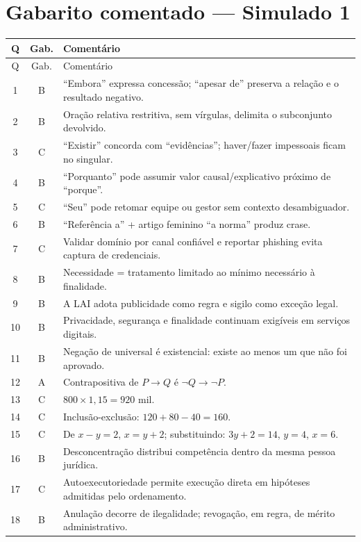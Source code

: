 \section{Gabarito comentado — Simulado 1}

\begin{longtable}{c c p{10.8cm}}
\toprule
Q & Gab. & Comentário \\
\midrule
\endfirsthead
\toprule Q & Gab. & Comentário \\
\midrule
\endhead
1 & B & ``Embora'' expressa concessão; ``apesar de'' preserva a relação e o resultado negativo. \\
2 & B & Oração relativa restritiva, sem vírgulas, delimita o subconjunto devolvido. \\
3 & C & ``Existir'' concorda com ``evidências''; haver/fazer impessoais ficam no singular. \\
4 & B & ``Porquanto'' pode assumir valor causal/explicativo próximo de ``porque''. \\
5 & C & ``Seu'' pode retomar equipe ou gestor sem contexto desambiguador. \\
6 & B & ``Referência a'' + artigo feminino ``a norma'' produz crase. \\
7 & C & Validar domínio por canal confiável e reportar phishing evita captura de credenciais. \\
8 & B & Necessidade = tratamento limitado ao mínimo necessário à finalidade. \\
9 & B & A LAI adota publicidade como regra e sigilo como exceção legal. \\
10 & B & Privacidade, segurança e finalidade continuam exigíveis em serviços digitais. \\
11 & B & Negação de universal é existencial: existe ao menos um que não foi aprovado. \\
12 & A & Contrapositiva de $P\rightarrow Q$ é $\neg Q\rightarrow\neg P$. \\
13 & C & $800\times1{,}15=920$ mil. \\
14 & C & Inclusão-exclusão: $120+80-40=160$. \\
15 & C & De $x-y=2$, $x=y+2$; substituindo: $3y+2=14$, $y=4$, $x=6$. \\
16 & B & Desconcentração distribui competência dentro da mesma pessoa jurídica. \\
17 & C & Autoexecutoriedade permite execução direta em hipóteses admitidas pelo ordenamento. \\
18 & B & Anulação decorre de ilegalidade; revogação, em regra, de mérito administrativo. \\

\end{longtable}
